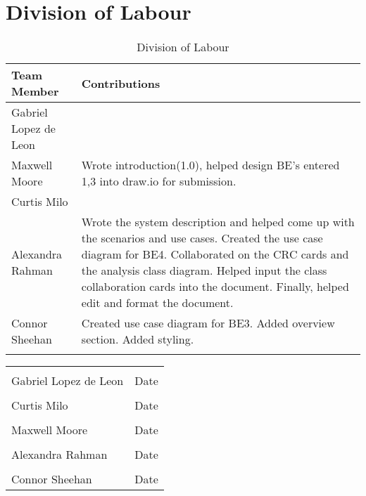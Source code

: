 \documentclass[titlepage]{article}
\begin{document}
\newpage

\appendix
\section{Division of Labour}
\label{sec:division_of_labour}
\begin{longtable}{| p{} | p{} |}
			\hline
			\textbf {Team Member} & \textbf{Contributions}\\ 
			\hline
			Gabriel Lopez de Leon &  %
			\\
			\hline
			Maxwell Moore & Wrote introduction(1.0), helped design BE's entered 1,3 into draw.io for submission.
			\\
			\hline
			Curtis Milo & %
			\\ 
			\hline
			Alexandra Rahman & Wrote the system description and helped come up with the scenarios and use cases. Created the use case diagram for BE4. Collaborated on the CRC cards and the analysis class diagram. Helped input the class collaboration cards into the document. Finally, helped edit and format the document.
			\\
			\hline
			Connor Sheehan & Created use case diagram for BE3. Added overview section. Added styling.\\
			\hline
			
			\caption{Division of Labour}
		\end{longtable}



\noindent\begin{tabular}{ll}\\
	\makebox[2.5in]{\hrulefill} & \makebox[2.5in]			{\hrulefill}\\
	Gabriel Lopez de Leon & Date\\[8ex]%
	\makebox[2.5in]{\hrulefill} & \makebox[2.5in]			{\hrulefill}\\
	Curtis Milo & Date\\[8ex]
	\makebox[2.5in]{\hrulefill} & \makebox[2.5in]			{\hrulefill}\\
	Maxwell Moore & Date\\[8ex]
	\makebox[2.5in]{\hrulefill} & \makebox[2.5in]			{\hrulefill}\\
	Alexandra Rahman & Date\\[8ex]
	\makebox[2.5in]{\hrulefill} & \makebox[2.5in]			{\hrulefill}\\
	Connor Sheehan & Date\\
	\end{tabular}
\end{document}
